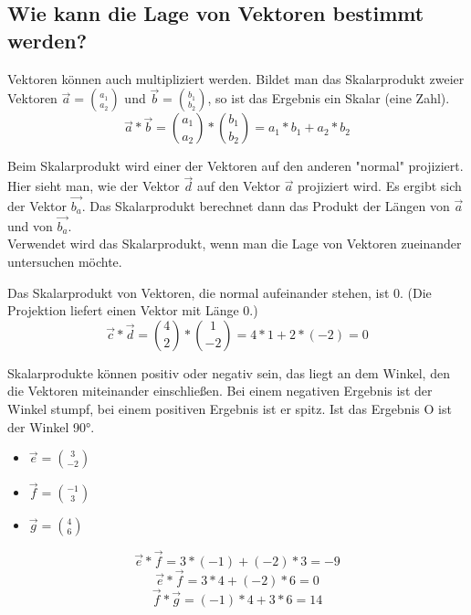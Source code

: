 \newpage
\subsection{Wie kann die Lage von Vektoren bestimmt werden?}

\hfill \break
Vektoren können auch multipliziert werden.
Bildet man das Skalarprodukt zweier Vektoren $\vec{a} = \binom{a_1}{a_2}$ und $\vec{b} = \binom{b_1}{b_2}$, so ist das Ergebnis ein Skalar (eine Zahl).
$$\vec{a} * \vec{b} = \binom{a_1}{a_2} * \binom{b_1}{b_2} = a_1 * b_1 + a_2 * b_2$$

\hfill \break
Beim Skalarprodukt wird einer der Vektoren auf den anderen "normal" projiziert.
Hier sieht man, wie der Vektor $\vec{d}$ auf den Vektor $\vec{a}$ projiziert wird.
Es ergibt sich der Vektor $\vec{b_a}$.
Das Skalarprodukt berechnet dann das Produkt der Längen von $\vec{a}$ und von $\vec{b_a}$.\\
Verwendet wird das Skalarprodukt, wenn man die Lage von Vektoren zueinander untersuchen möchte.

\hfill \break
Das Skalarprodukt von Vektoren, die normal aufeinander stehen, ist 0.
(Die Projektion liefert einen Vektor mit Länge 0.)
$$\vec{c} * \vec{d} = \binom{4}{2} * \binom{1}{-2} = 4 * 1 + 2 * (-2) = 0$$

\hfill \break
Skalarprodukte können positiv oder negativ sein, das liegt an dem Winkel, den die Vektoren miteinander einschließen.
Bei einem negativen Ergebnis ist der Winkel stumpf, bei einem positiven Ergebnis ist er spitz. Ist das Ergebnis O ist der Winkel 90°.

\hfill \break
\begin{itemize}
    \item $\vec{e} = \binom{3}{-2}$
    \item $\vec{f} = \binom{-1}{3}$
    \item $\vec{g} = \binom{4}{6}$
\end{itemize}

\hfill \break
$$\vec{e} * \vec{f} = 3 * (-1) + (-2) * 3 = -9$$
$$\vec{e}*\vec{f} = 3 * 4 + (-2) * 6 = 0$$
$$\vec{f} * \vec{g} = (-1) * 4 + 3 * 6 = 14$$